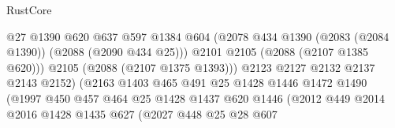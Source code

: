\begin{lexlean}{RustCore}
\begin{coremodule}
                                            @27
                                            @1390
                                            @620
                                            @637
                                            @597
                                            @1384
                                            @604
                                            (@2078
                                              @434
                                              @1390
                                              (@2083 (@2084 @1390))
                                              (@2088 (@2090 @434 @25)))
                                            @2101
                                            @2105
                                            (@2088 (@2107 @1385 @620)))
                                          @2105
                                          (@2088 (@2107 @1375 @1393)))
                                        @2123
                                        @2127
                                        @2132
                                        @2137
                                        @2143
                                        @2152)
                                      (@2163
                                        @1403
                                        @465
                                        @491
                                        @25
                                        @1428
                                        @1446
                                        @1472
                                        @1490
                                        (@1997
                                          @450
                                          @457
                                          @464
                                          @25
                                          @1428
                                          @1437
                                          @620
                                          @1446
                                          (@2012
                                            @449
                                            @2014
                                            @2016
                                            @1428
                                            @1435
                                            @627
                                            (@2027
                                              @448
                                              @25
                                              @28
                                              @607

\end{coremodule}
\end{lexlean}
